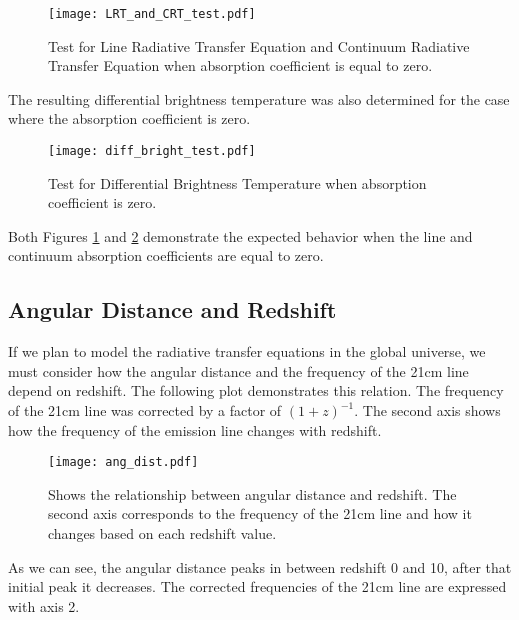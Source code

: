 \documentclass[apj]{emulateapj}
\begin{document}
\begin{figure}[H]
\texttt{[image: LRT\_and\_CRT\_test.pdf]}
\caption{Test for Line Radiative Transfer Equation and Continuum Radiative Transfer Equation when absorption coefficient is equal to zero.\vspace{3mm}}
\label{fig:test1}
\end{figure}

The resulting differential brightness temperature was also determined for the case where the absorption coefficient is zero.

\begin{figure}[H]
\texttt{[image: diff\_bright\_test.pdf]}
\caption{Test for Differential Brightness Temperature when absorption coefficient is zero.\vspace{3mm}}
\label{fig:test2}
\end{figure}

Both Figures \ref{fig:test1} and \ref{fig:test2} demonstrate the expected behavior when the line and continuum absorption coefficients are equal to zero.

\subsection{Angular Distance and Redshift}

If we plan to model the radiative transfer equations in the global universe, we must consider how the angular distance and the frequency of the 21cm line depend on redshift. The following plot demonstrates this relation. The frequency of the 21cm line was corrected by a factor of $(1+z)^{-1}$. The second axis shows how the frequency of the emission line changes with redshift.

\begin{figure}[H]
\texttt{[image: ang\_dist.pdf]}
\caption{Shows the relationship between angular distance and redshift. The second axis corresponds to the frequency of the 21cm line and how it changes based on each redshift value.\vspace{3mm}}
\label{fig:ang_dist}
\end{figure}

As we can see, the angular distance peaks in between redshift 0 and 10, after that initial peak it decreases. The corrected frequencies of the 21cm line are expressed with axis 2.






\end{document}
